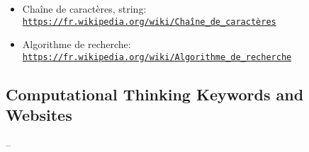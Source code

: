 \documentclass[a4paper,11pt]{report}
\newcommand{\BrochureUrlText}[1]{\texttt{#1}}
\begin{document}
\begin{itemize}
  \item Chaîne de caractères, string: \href{https://fr.wikipedia.org/wiki/Cha\%C3\%AEne_de_caract\%C3\%A8res}{\BrochureUrlText{https://fr.wikipedia.org/wiki/Chaîne\_de\_caractères}}
  \item Algorithme de recherche: \href{https://fr.wikipedia.org/wiki/Algorithme_de_recherche}{\BrochureUrlText{https://fr.wikipedia.org/wiki/Algorithme\_de\_recherche}}
\end{itemize}


\subsection*{Computational Thinking Keywords and Websites}

–
\end{document}
